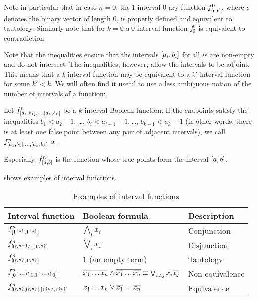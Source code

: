 Note in particular that in case $n=0$,
the $1$-interval $0$-ary function
$f^{0}_{[\epsilon, \epsilon]}$,
where $\epsilon$ denotes the binary vector of length $0$,
is properly defined and equivalent to tautology.
Similarly note that for $k=0$
a $0$-interval function $f^n_{\emptyset}$
is equivalent to contradiction.

Note that the inequalities ensure
that the intervals $[a_i, b_i]$ for all $i$s
are non-empty and do not intersect.
The inequalities, however, allow the intervals to be adjoint.
This means that a $k$-interval function
may be equivalent to a $k'$-interval function
for some $k' < k$.
We will often find it useful to use a less ambiguous notion of the number of intervals of a function:
\begin{definition}
\label{def:properkibf}
Let
$f^n_{[a_1, b_1], \ldots, [a_k, b_k]}$
be a $k$-interval Boolean function.
If the endpoints satisfy the inequalities
$b_1 < a_2 - 1$, \ldots, $b_i < a_{i+1} - 1$, \ldots,
$b_{k-1} < a_k - 1$
(in other words,
there is at least one false point
between any pair of adjacent intervals),
we call
$f^n_{[a_1, b_1], \ldots, [a_k, b_k]}$
a .
\end{definition}



Especially,
$f^{n}_{[a, b]}$ is the function
whose true points form the interval $[a, b]$.

shows examples of interval functions.

\begin{table}[h]
\centering
\begin{tabular}{lll}
Interval function & Boolean formula & Description \\
\hline
$f^{n}_{[1^{\{n\}}, 1^{\{n\}}]}$ &
$\bigwedge_i{x_i}$ & Conjunction \\
$f^{n}_{[0^{\{n-1\}} 1, 1^{\{n\}}]}$ &
$\bigvee_i{x_i}$ & Disjunction \\
$f^{n}_{[0^{\{n\}}, 1^{\{n\}}]}$ &
$1$ (an empty term) & Tautology \\
$f^{n}_{[0^{\{n-1\}} 1, 1^{\{n-1\}} 0]}$ &
$\overline{x_1 \ldots x_n} \wedge
\overline{\overline{x_1} \ldots \overline{x_n}}
\equiv \bigvee_{i \neq j}{x_i \overline{x_j}}$ &
Non-equivalence \\
$f^n_{[0^{\{n\}}, 0^{\{n\}}],
[1^{\{n\}}, 1^{\{n\}}]}$ &
$x_1 \ldots x_n \vee \overline{x_1} \ldots \overline{x_n}$ &
Equivalence
\end{tabular}
\caption{Examples of interval functions}
\label{tab:exampleintfns}
\end{table}


